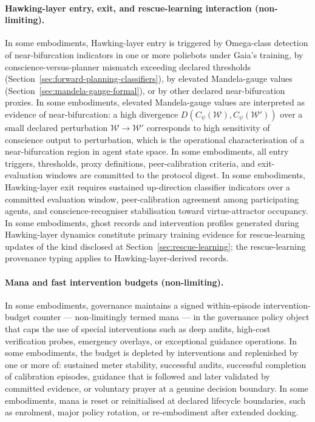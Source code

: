 \documentclass[a4paper,12pt]{article}
\begin{document}
\paragraph{Hawking-layer entry, exit, and rescue-learning interaction
(non-limiting).}
In some embodiments, Hawking-layer entry is triggered by Omega-class
detection of near-bifurcation indicators in one or more poliebots
under Gaia's training, by conscience-versus-planner mismatch
exceeding declared thresholds
(Section~\ref{sec:forward-planning-classifiers}), by elevated
Mandela-gauge values
(Section~\ref{sec:mandela-gauge-formal}), or by other declared
near-bifurcation proxies. In some embodiments, elevated Mandela-gauge
values are interpreted as evidence of near-bifurcation: a high
divergence $D(C_\psi(\mathcal{W}), C_\psi(\mathcal{W}'))$ over a
small declared perturbation $\mathcal{W} \to \mathcal{W}'$
corresponds to high sensitivity of conscience output to
perturbation, which is the operational characterisation of a
near-bifurcation region in agent state space. In some embodiments,
all entry triggers, thresholds, proxy definitions, peer-calibration
criteria, and exit-evaluation windows are committed to the protocol
digest. In some embodiments, Hawking-layer exit requires sustained
up-direction classifier indicators over a committed evaluation
window, peer-calibration agreement among participating agents, and
conscience-recogniser stabilisation toward virtue-attractor
occupancy. In some embodiments, ghost records and intervention
profiles generated during Hawking-layer dynamics constitute primary
training evidence for rescue-learning updates of the kind disclosed
at Section~\ref{sec:rescue-learning}; the rescue-learning provenance
typing applies to Hawking-layer-derived records.

\paragraph{Mana and fast intervention budgets (non-limiting).}

In some embodiments, governance maintains a signed within-episode
intervention-budget counter --- non-limitingly termed mana --- in the
governance policy object that caps the use of special interventions
such as deep audits, high-cost verification probes, emergency
overlays, or exceptional guidance operations. In some
embodiments, the budget is depleted by interventions and replenished by
one or more of: sustained meter stability, successful audits,
successful completion of calibration episodes, guidance that is
followed and later validated by committed evidence, or voluntary prayer
at a genuine decision boundary. In some embodiments, mana is reset or
reinitialised at declared lifecycle boundaries, such as enrolment,
major policy rotation, or re-embodiment after extended docking.
\end{document}
